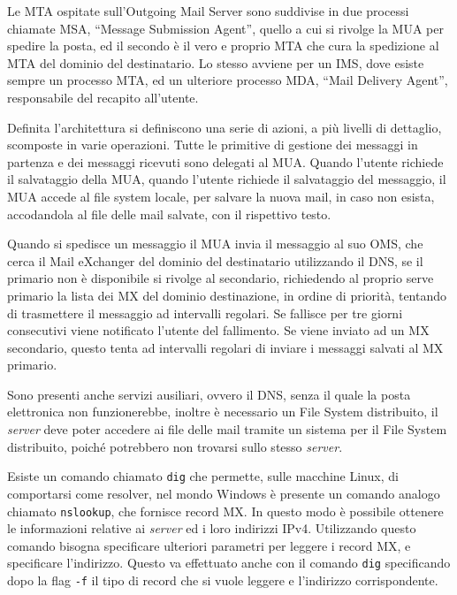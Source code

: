 \documentclass{article}
\numberwithin{equation}{subsection}
\begin{document}
Le MTA ospitate sull'Outgoing Mail Server sono suddivise in due processi chiamate MSA, ``Message Submission Agent'', quello a cui si rivolge la MUA per spedire la posta, ed il secondo è il vero e proprio MTA che cura la spedizione al MTA del dominio del destinatario. Lo stesso avviene per un IMS, dove esiste sempre un processo MTA, ed un ulteriore processo MDA, ``Mail Delivery Agent'', responsabile del recapito all'utente. 


Definita l'architettura si definiscono una serie di azioni, a più livelli di dettaglio, scomposte in varie operazioni. Tutte le primitive di gestione dei messaggi in partenza e dei messaggi ricevuti 
sono delegati al MUA. Quando l'utente richiede il salvataggio della MUA, quando l'utente richiede il salvataggio del messaggio, il MUA accede al file system locale, per salvare la nuova mail, in caso non esista, accodandola al file delle mail salvate, con il rispettivo testo. 

Quando si spedisce un messaggio il MUA invia il messaggio al suo OMS, che cerca il Mail eXchanger del dominio del destinatario utilizzando il \textcolor{Mahogany}{DNS}, se il primario non è disponibile si rivolge al secondario, richiedendo al proprio serve primario la lista dei MX del dominio destinazione, in ordine di priorità, tentando di trasmettere il messaggio ad intervalli regolari. Se fallisce per tre giorni consecutivi viene notificato l'utente del fallimento. Se viene inviato ad un MX secondario, questo tenta ad intervalli regolari di inviare i messaggi salvati al MX primario. 

Sono presenti anche servizi ausiliari, ovvero il \textcolor{Mahogany}{DNS}, senza il quale la posta elettronica non funzionerebbe, inoltre è necessario un File System distribuito, il \textit{server} deve poter accedere ai file delle mail tramite un sistema per il File System distribuito, poiché potrebbero non trovarsi sullo stesso \textit{server}. 

Esiste un comando chiamato \verb|dig| che permette, sulle macchine Linux, di comportarsi come resolver, nel mondo Windows è presente un comando analogo chiamato \verb|nslookup|, che fornisce record MX. In questo modo è possibile ottenere le informazioni relative ai \textit{server} ed i loro indirizzi \textcolor{BurntOrange}{IPv4}. Utilizzando questo comando bisogna specificare ulteriori parametri per leggere i record MX, e specificare l'indirizzo. Questo va effettuato anche con il comando \verb|dig| specificando dopo la flag \verb|-f| il tipo di record che si vuole leggere e l'indirizzo corrispondente. 
\end{document}
